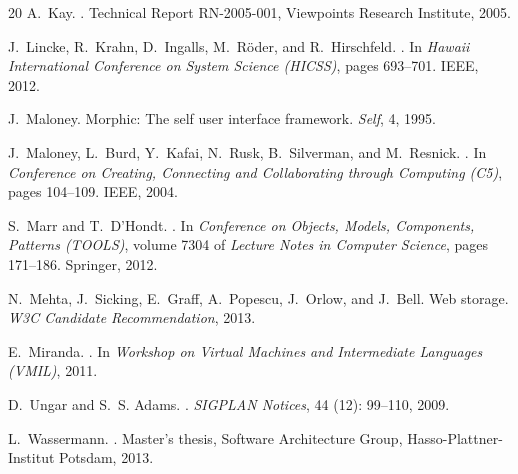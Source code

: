 \documentclass[natbib]{sigplanconf}
\begin{document}
{\begin{thebibliography}{20}
A.~Kay.
.
\newblock Technical Report RN-2005-001, Viewpoints Research Institute, 2005.

J.~Lincke, R.~Krahn, D.~Ingalls, M.~R\"oder, and R.~Hirschfeld.
.
\newblock In \emph{Hawaii International Conference on System Science (HICSS)},
  pages 693--701. IEEE, 2012.

J.~Maloney.
\newblock Morphic: The self user interface framework.
\newblock \emph{Self}, 4, 1995.

J.~Maloney, L.~Burd, Y.~Kafai, N.~Rusk, B.~Silverman, and M.~Resnick.
.
\newblock In \emph{Conference on Creating, Connecting and Collaborating through
  Computing (C5)}, pages 104--109. IEEE, 2004.

S.~Marr and T.~D'Hondt.
.
\newblock In \emph{Conference on Objects, Models, Components, Patterns
  (TOOLS)}, volume 7304 of \emph{Lecture Notes in Computer Science}, pages
  171--186. Springer, 2012.

N.~Mehta, J.~Sicking, E.~Graff, A.~Popescu, J.~Orlow, and J.~Bell.
\newblock Web storage.
\newblock \emph{W3C Candidate Recommendation}, 2013.

E.~Miranda.
.
\newblock In \emph{Workshop on Virtual Machines and Intermediate Languages
  (VMIL)}, 2011.

D.~Ungar and S.~S. Adams.
.
\newblock \emph{SIGPLAN Notices}, 44 (12): 99--110, 2009.

L.~Wassermann.
.
\newblock Master's thesis, Software Architecture Group, Hasso-Plattner-Institut
  Potsdam, 2013.


\end{thebibliography}}
\end{document}
